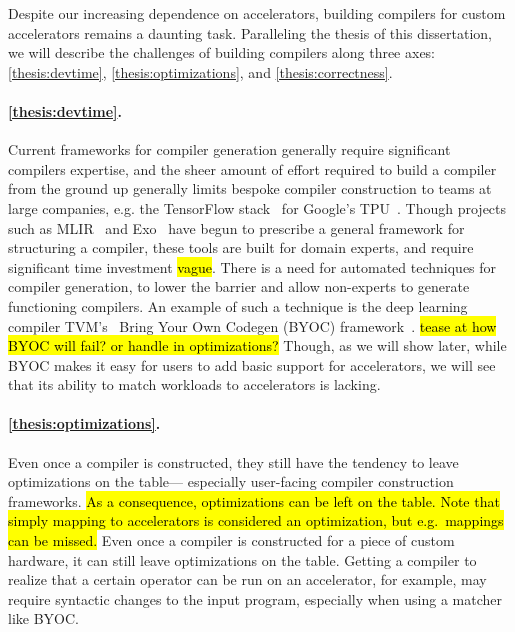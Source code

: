 Despite our increasing dependence
  on accelerators,
  building compilers
  for custom accelerators
  remains a daunting task.
Paralleling the thesis of this dissertation,
  we will describe the challenges
  of building compilers
  along three axes:
  \cref{thesis:devtime},
  \cref{thesis:optimizations},
  and \cref{thesis:correctness}.
  

\paragraph{
\cref{thesis:devtime}.
}
Current frameworks for compiler generation
  generally require significant compilers expertise,
  and the sheer amount of effort
  required to build a compiler from the ground up
  generally limits bespoke compiler construction
  to teams
  at large companies,
  e.g. the TensorFlow 
  stack~\cite{abadi2016tensorflow}
  for Google's 
  TPU~\cite{jouppi2017tpu,jouppi2020tpu}.
Though projects
  such as 
  MLIR~\cite{mlir,
  lattner2021mlir,
  eldridge2021mlir}
  and
  Exo~\cite{ExoPldi22}
  have begun to prescribe
  a general framework
  for structuring a compiler,
  these tools are built for
  domain experts,
  and require significant time investment
  \hl{vague}.
There is a need for
  automated techniques
  for compiler generation,
  to lower the barrier
  and allow non-experts to generate
  functioning compilers.
An example of such a technique
  is the deep learning compiler
  TVM's~\cite{chen2018tvm}
  Bring Your Own Codegen (BYOC)
  framework~\cite{chen2021byoc}.
\hl{tease at how BYOC will fail? or handle in optimizations?}
Though, 
  as we will show later,
  while BYOC makes it easy for
  users to add basic support
  for accelerators,
  we will see 
  that its ability to 
  match workloads to accelerators
  is lacking.

\paragraph{
\cref{thesis:optimizations}.
}
Even once a compiler is constructed,
  they still have the tendency
  to leave optimizations on the table---%
  especially user-facing compiler construction frameworks.
\hl{As a consequence, optimizations can be left on the table.
Note that simply mapping to accelerators
  is considered an optimization,
  but e.g.~mappings can be missed.}
Even once a compiler
  is constructed
  for a piece of custom hardware,
  it can still leave optimizations
  on the table.
Getting a compiler to realize
  that a certain operator
  can be run on an accelerator,
  for example,
  may require syntactic changes
  to the input program,
  especially when using
  a matcher like
  BYOC.

